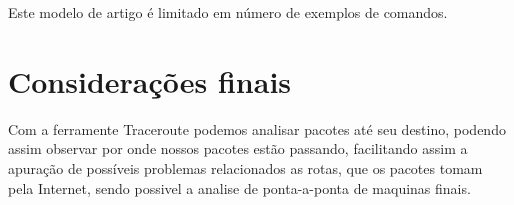 \documentclass[
	article,			%
	11pt,				%
	oneside,			%
	a4paper,			%
	english,			%
	brazil,				%
	sumario=tradicional
	]{abntex2}
\begin{document}
Este modelo de artigo é limitado em número de exemplos de comandos.

% 

\section{Considerações finais}
  Com a ferramente Traceroute podemos analisar pacotes até seu destino, podendo assim observar por onde nossos pacotes estão passando, facilitando assim a apuração de possíveis problemas relacionados as rotas, que os pacotes tomam pela Internet, sendo possivel a analise de ponta-a-ponta de maquinas finais.


\end{document}
